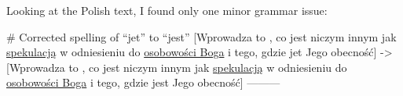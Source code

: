 Looking at the Polish text, I found only one minor grammar issue:

# Corrected spelling of “jet” to “jest”
[Wprowadza to , co jest niczym innym jak \underline{spekulacją} w odniesieniu do \underline{osobowości Boga} i tego, gdzie jet Jego obecność]
->
[Wprowadza to , co jest niczym innym jak \underline{spekulacją} w odniesieniu do \underline{osobowości Boga} i tego, gdzie jest Jego obecność]
---------
